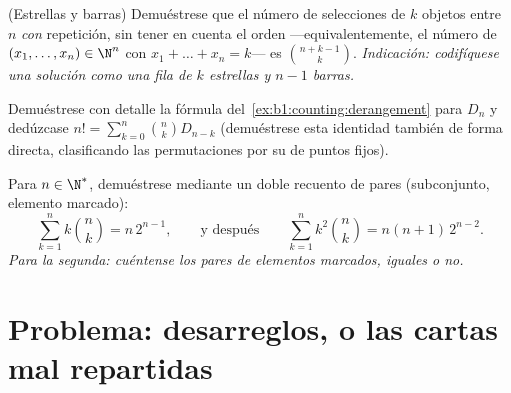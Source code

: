 \begin{exercise}[$\star\star$]\label{exo:b1:counting:10}
(Estrellas y barras) Demuéstrese que el número de selecciones de $k$
objetos entre $n$ \emph{con} repetición, sin tener en cuenta el orden
---equivalentemente, el número de $(x_1, \dots, x_n) \in \N^n$ con
$x_1 + \dots + x_n = k$--- es $\binom{n + k - 1}{k}$. \emph{Indicación:
codifíquese una solución como una fila de $k$ estrellas y $n - 1$ barras.}
\end{exercise}

\begin{exercise}[$\star\star\star$]\label{exo:b1:counting:11}
Demuéstrese con detalle la fórmula del~\cref{ex:b1:counting:derangement}
para $D_n$ y dedúzcase $n! = \sum_{k=0}^{n} \binom{n}{k} D_{n-k}$
(demuéstrese esta identidad también de forma directa, clasificando las
permutaciones por su  de puntos fijos).
\end{exercise}

\begin{exercise}[$\star\star\star$]\label{exo:b1:counting:12}
Para $n \in \N^*$, demuéstrese mediante un doble recuento de pares
(subconjunto, elemento marcado):
\[
\sum_{k=1}^{n} k \binom{n}{k} = n\, 2^{n-1},
\qquad\text{y después}\qquad
\sum_{k=1}^{n} k^2 \binom{n}{k} = n(n+1)\, 2^{n-2} .
\]
\emph{Para la segunda: cuéntense los pares de elementos marcados, iguales o no.}
\end{exercise}

\section{Problema: desarreglos, o las cartas mal repartidas}

